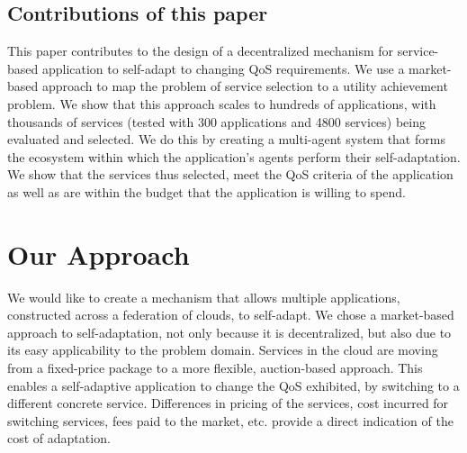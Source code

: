 \documentclass[10pt,journal,compsoc]{IEEEtran}
\begin{document}
\subsection{Contributions of this paper}
This paper contributes to the design of a decentralized mechanism for service-based application to self-adapt to changing QoS requirements. We use a market-based approach to map the problem of service selection to a utility achievement problem.  We show that this approach scales to hundreds of applications, with thousands of services (tested with 300 applications and 4800 services) being evaluated and selected. We do this by creating a multi-agent system that forms the ecosystem within which the application's agents perform their self-adaptation. We show that the services thus selected, meet the QoS criteria of the application as well as are within the budget that the application is willing to spend. 
  
\section{Our Approach}
We would like to create a mechanism that allows multiple applications, constructed across a federation of clouds, to self-adapt. We chose a market-based approach to self-adaptation, not only because it is decentralized, but also due to its easy applicability to the problem domain. Services in the cloud are moving from a fixed-price package to a more flexible, auction-based approach\cite{Amazon2010SpotInstance}. This enables a self-adaptive application to change the QoS exhibited, by switching to a different concrete service. Differences in pricing of the services, cost incurred for switching services, fees paid to the market, etc. provide a direct indication of the cost of adaptation. 
\end{document}
